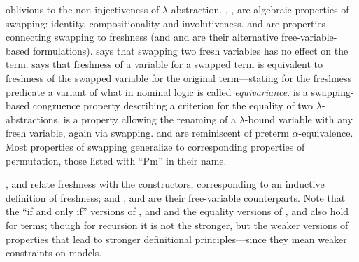 oblivious to the non-injectiveness of $\lambda$-abstraction.  
%
\SwId{}, \SwCp{}, \SwIv{} are algebraic properties of swapping: 
identity, compositionality and involutiveness. 
%
\SwFr{} and \FrSw{} are properties connecting swapping to freshness (and \SwFv{} and \FvSw{} are their alternative free-variable-based formulations).  
\SwFr{} says that swapping two fresh variables has no effect on the term. 
\FrSw{} says that freshness of a variable for a swapped term is equivalent to freshness of the swapped variable for the original term---stating for the freshness predicate a variant of what in nominal logic is called \emph{equivariance}. 
%
%
\SwCg{} is a swapping-based congruence property 
describing a criterion for the equality of two $\lambda$-abstractions. 
\SwBvr{} is a property allowing the renaming 
of a $\lambda$-bound variable with any fresh variable, again via swapping. \SwCg{} and \SwBvr{} are reminiscent of preterm $\alpha$-equivalence. 
%
Most properties of swapping generalize %
to corresponding properties of permutation, those listed with ``\textsf{Pm}'' in their name.
%
%
%

\FrVr{}, \FrAp{} and \FrLm{} relate freshness with the constructors, 
corresponding to %
an inductive definition 
of freshness; and \FvVr{}, \FvAp{} and \FvLm{} are their %
 free-variable %
 counterparts. %
Note %
that %
the ``if and only if'' versions of \FrVr{}, \FrAp{} and \FrLm{}  and the equality versions of \FvVr{}, \FvAp{} and \FvLm{} also hold for terms; though %
for recursion it is not the stronger, but the weaker versions of properties that lead to stronger definitional principles---since they mean weaker constraints on %
 models. 



